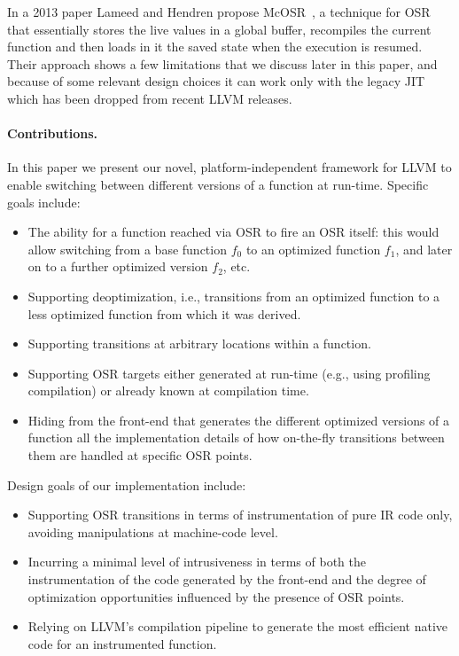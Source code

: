 In a 2013 paper Lameed and Hendren propose McOSR~\cite{lameed2013modular}, a technique for OSR that essentially stores the live values in a global buffer, recompiles the current function and then loads in it the saved state when the execution is resumed. Their approach shows a few limitations that we discuss later in this paper, and because of some relevant design choices it can work only with the legacy JIT which has been dropped from recent LLVM releases.

\paragraph{Contributions.}
In this paper we present our novel, platform-independent framework for LLVM to enable switching between different versions of a function at run-time. Specific goals include:
\begin{itemize}
\item The ability for a function reached via OSR to fire an OSR itself: this would allow switching from a base function $f_0$ to an optimized function $f_1$, and later on to a further optimized version $f_2$, etc.
\item Supporting deoptimization, i.e., transitions from an optimized function to a less optimized function from which it was derived.
\item Supporting transitions at arbitrary locations within a function.
\item Supporting OSR targets either generated at run-time (e.g., using profiling compilation) or already known at compilation time.
\item Hiding from the front-end that generates the different optimized versions of a function all the implementation details of how on-the-fly transitions between them are handled at specific OSR points.
\end{itemize}

Design goals of our implementation include:
\begin{itemize}
\item Supporting OSR transitions in terms of instrumentation of pure IR code only, avoiding manipulations at machine-code level.
\item Incurring a minimal level of intrusiveness in terms of both the instrumentation of the code generated by the front-end and the degree of optimization opportunities influenced by the presence of OSR points.
\item Relying on LLVM's compilation pipeline to generate the most efficient native code for an instrumented function.
\end{itemize}

